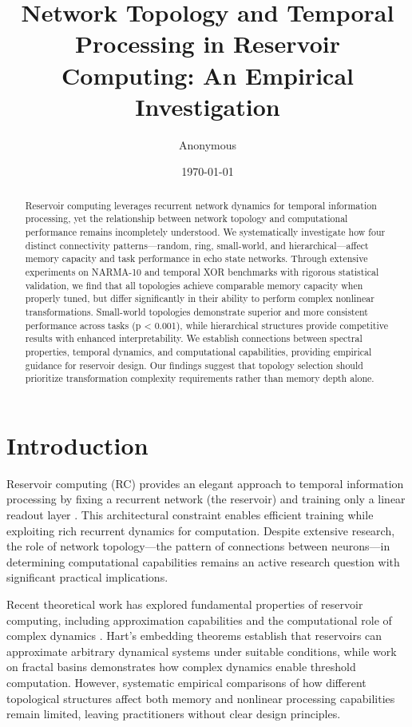 \documentclass{article}
\title{Network Topology and Temporal Processing in Reservoir Computing: An Empirical Investigation}
\author{Anonymous}
\date{\today}
\begin{document}
\maketitle

\begin{abstract}
Reservoir computing leverages recurrent network dynamics for temporal information processing, yet the relationship between network topology and computational performance remains incompletely understood. We systematically investigate how four distinct connectivity patterns—random, ring, small-world, and hierarchical—affect memory capacity and task performance in echo state networks. Through extensive experiments on NARMA-10 and temporal XOR benchmarks with rigorous statistical validation, we find that all topologies achieve comparable memory capacity when properly tuned, but differ significantly in their ability to perform complex nonlinear transformations. Small-world topologies demonstrate superior and more consistent performance across tasks (p < 0.001), while hierarchical structures provide competitive results with enhanced interpretability. We establish connections between spectral properties, temporal dynamics, and computational capabilities, providing empirical guidance for reservoir design. Our findings suggest that topology selection should prioritize transformation complexity requirements rather than memory depth alone.
\end{abstract}

\section{Introduction}

Reservoir computing (RC) provides an elegant approach to temporal information processing by fixing a recurrent network (the reservoir) and training only a linear readout layer \cite{jaeger2001echo, maass2002real}. This architectural constraint enables efficient training while exploiting rich recurrent dynamics for computation. Despite extensive research, the role of network topology—the pattern of connections between neurons—in determining computational capabilities remains an active research question with significant practical implications.

Recent theoretical work has explored fundamental properties of reservoir computing, including approximation capabilities \cite{hart2022spatial} and the computational role of complex dynamics \cite{hart2024fractal}. Hart's embedding theorems establish that reservoirs can approximate arbitrary dynamical systems under suitable conditions, while work on fractal basins demonstrates how complex dynamics enable threshold computation. However, systematic empirical comparisons of how different topological structures affect both memory and nonlinear processing capabilities remain limited, leaving practitioners without clear design principles.
\end{document}
